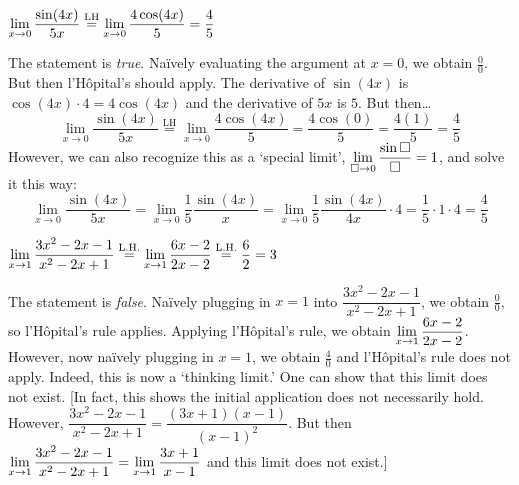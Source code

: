 \documentclass[11pt,letterpaper]{article}
\begin{document}
 $\displaystyle\lim_{x \to 0} \dfrac{\sin(4x)}{5x} \stackrel{\text{LH}}{=} \lim_{x \to 0} \dfrac{4\cos(4x)}{5}= \dfrac{4}{5}$ \pspace

\sol The statement is \textit{true}. Na\"ively evaluating the argument at $x= 0$, we obtain $\frac{0}{0}$. But then l'H\^{o}pital's should apply. The derivative of $\sin(4x)$ is $\cos(4x) \cdot 4= 4 \cos(4x)$ and the derivative of $5x$ is $5$. But then\dots
	\[
	\lim_{x \to 0} \dfrac{\sin(4x)}{5x} \stackrel{\text{LH}}{=} \lim_{x \to 0} \dfrac{4\cos(4x)}{5}= \dfrac{4 \cos(0)}{5}= \dfrac{4(1)}{5}= \dfrac{4}{5}
	\]
However, we can also recognize this as a `special limit', $\displaystyle\lim_{\Box{} \to 0} \dfrac{\sin \Box{}}{\Box{}}= 1$, and solve it this way:
	\[
	\lim_{x \to 0} \dfrac{\sin(4x)}{5x}= \lim_{x \to 0} \dfrac{1}{5} \dfrac{\sin(4x)}{x}= \lim_{x \to 0} \dfrac{1}{5} \dfrac{\sin(4x)}{4x} \cdot 4= \dfrac{1}{5} \cdot 1 \cdot 4= \dfrac{4}{5}
	\] \pvspace{1.3cm}



 $\displaystyle\lim_{x \to 1} \dfrac{3x^2 - 2x - 1}{x^2 - 2x + 1} \stackrel{\text{L.H.}}{=} \lim_{x \to 1} \dfrac{6x - 2}{2x - 2} \stackrel{\text{L.H.}}{=} \dfrac{6}{2}= 3$ \pspace

\sol The statement is \textit{false}. Na\"ively plugging in $x= 1$ into $\dfrac{3x^2 - 2x - 1}{x^2 - 2x + 1}$, we obtain $\frac{0}{0}$, so l'H\^{o}pital's rule applies. Applying l'H\^{o}pital's rule, we obtain $\displaystyle\lim_{x \to 1} \dfrac{6x - 2}{2x - 2}$. However, now na\"ively plugging in $x= 1$, we obtain $\frac{4}{0}$ and l'H\^{o}pital's rule does not apply. Indeed, this is now a `thinking limit.' One can show that this limit does not exist. [In fact, this shows the initial application does not necessarily hold. However, $\dfrac{3x^2 - 2x - 1}{x^2 - 2x + 1}= \dfrac{(3x + 1)(x - 1)}{(x - 1)^2}$. But then $\displaystyle\lim_{x \to 1} \dfrac{3x^2 - 2x - 1}{x^2 - 2x + 1}= \lim_{x \to 1} \dfrac{3x + 1}{x - 1}$ and this limit does not exist.] \pvspace{1.3cm}
\end{document}
